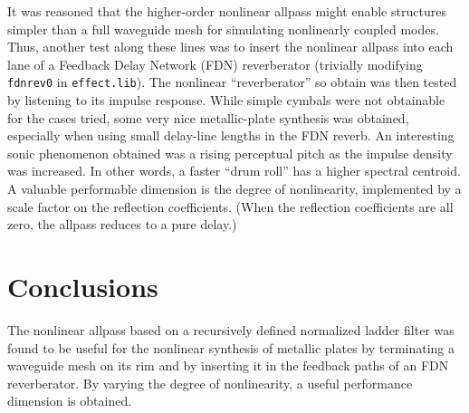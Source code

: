 \documentclass[twoside,a4paper]{article}
\begin{document}
It was reasoned that the higher-order nonlinear allpass might enable
structures simpler than a full waveguide mesh for simulating
nonlinearly coupled modes.  Thus, another test along these lines was
to insert the nonlinear allpass into each lane of a Feedback Delay
Network (FDN) reverberator (trivially modifying \texttt{fdnrev0} in
\texttt{effect.lib}).  The nonlinear ``reverberator'' so obtain was
then tested by listening to its impulse response.  While simple
cymbals were not obtainable for the cases tried, some very nice
metallic-plate synthesis was obtained, especially when using small
delay-line lengths in the FDN reverb.  An interesting sonic phenomenon
obtained was a rising perceptual pitch as the impulse density was
increased.  In other words, a faster ``drum roll'' has a higher
spectral centroid.  A valuable performable dimension is the degree of
nonlinearity, implemented by a scale factor on the reflection
coefficients.  (When the reflection coefficients are all zero, the
allpass reduces to a pure delay.)

\section{Conclusions}

The nonlinear allpass based on a recursively defined normalized ladder
filter was found to be useful for the nonlinear synthesis of metallic
plates by terminating a waveguide mesh on its rim and by inserting it
in the feedback paths of an FDN reverberator.  By varying the degree
of nonlinearity, a useful performance dimension is obtained.

{%
\raggedright
\nocite{*}


}
\end{document}

